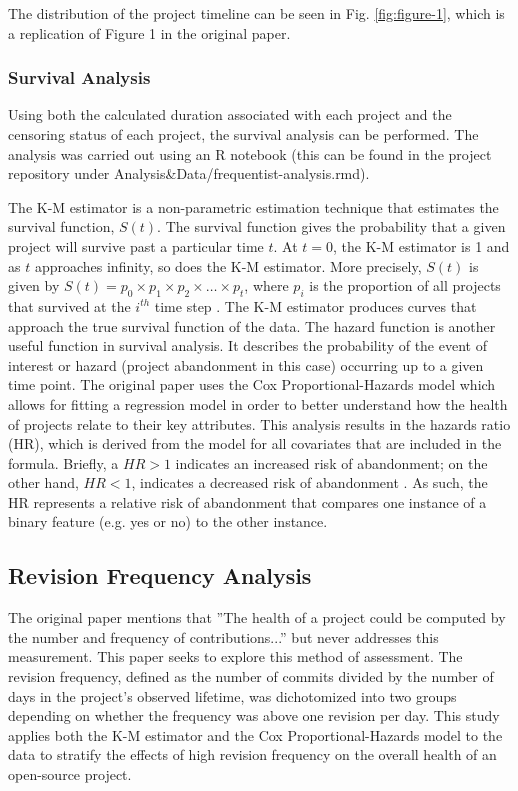 \documentclass[acmconf]{acmart}
\begin{document}
The distribution of the project timeline can be seen in Fig. \ref{fig:figure-1}, which is a replication of Figure 1 in the original paper.

\subsubsection{Survival Analysis}
Using both the calculated duration associated with each project and the censoring status of each project, the survival analysis can be performed.
The analysis was carried out using an R notebook (this can be found in the project repository under Analysis\&Data/frequentist-analysis.rmd).

The K-M estimator is a non-parametric estimation technique that estimates the survival function, $S(t)$.
The survival function gives the probability that a given project will survive past a particular time $t$.
At $t = 0$, the K-M estimator is 1 and as $t$ approaches infinity, so does the K-M estimator.
More precisely, $S(t)$ is given by  $S(t) = p_0 \times p_1 \times p_2 \times \dots \times p_t$, where $p_i$ is the proportion of all projects that survived at the $i^{th}$ time step \cite{kaplan1958nonparametric}.
The K-M estimator produces curves that approach the true survival function of the data.
The hazard function is another useful function in survival analysis. It describes the probability of the event of interest or hazard (project abandonment in this case) occurring up to a given time point.
The original paper uses the Cox Proportional-Hazards model which allows for fitting a regression model in order to better understand how the health of projects relate to their key attributes. 
This analysis results in the hazards ratio (HR), which is derived from the model for all covariates that are included in the formula. 
Briefly, a $HR > 1$ indicates an increased risk of abandonment; on the other hand, $HR < 1$, indicates a decreased risk of abandonment \cite{cox1972regression}. 
As such, the HR represents a relative risk of abandonment that compares one instance of a binary feature (e.g. yes or no) to the other instance.

\subsection{Revision Frequency Analysis} \label{revisionFreq}

The original paper mentions that ''The health of a project could be computed by the number and frequency of contributions...'' but never addresses this measurement.
This paper seeks to explore this method of assessment. 
The revision frequency, defined as the number of commits divided by the number of days in the project's observed lifetime, was dichotomized into two groups depending on whether the frequency was above one revision per day.
This study applies both the K-M estimator and the Cox Proportional-Hazards model to the data to stratify the effects of high revision frequency on the overall health of an open-source project.
\end{document}
